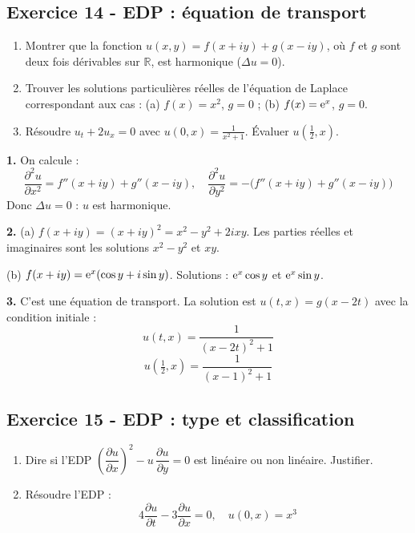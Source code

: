 \documentclass[12pt,a4paper]{article}
\begin{document}
\newpage
\subsection*{Exercice 14 - EDP : équation de transport \niveau{\moyen}}

\begin{boiteexercice}
\begin{enumerate}
  \item Montrer que la fonction $u(x,y) = f(x+iy) + g(x-iy)$, où $f$ et $g$ sont deux fois dérivables sur $\mathbb{R}$, est harmonique ($\Delta u = 0$).
  \item Trouver les solutions particulières réelles de l'équation de Laplace correspondant aux cas : (a) $f(x) = x^2$, $g = 0$ ; (b) $f(x) = \mathrm{e}^x$, $g = 0$.
  \item Résoudre $u_t + 2u_x = 0$ avec $u(0,x) = \frac{1}{x^2+1}$. Évaluer $u\!\left(\frac{1}{2},x\right)$.
\end{enumerate}
\end{boiteexercice}

\begin{boitecorrige}
\textbf{1.} On calcule :
\[
\frac{\partial^2 u}{\partial x^2} = f''(x+iy) + g''(x-iy), \quad \frac{\partial^2 u}{\partial y^2} = -\bigl(f''(x+iy) + g''(x-iy)\bigr)
\]
Donc $\Delta u = 0$ : $u$ est harmonique.

\textbf{2.} (a) $f(x+iy) = (x+iy)^2 = x^2 - y^2 + 2ixy$. Les parties réelles et imaginaires sont les solutions $x^2 - y^2$ et $xy$.

(b) $f(x+iy) = \mathrm{e}^x(\cos y + i\sin y)$. Solutions : $\mathrm{e}^x\cos y$ et $\mathrm{e}^x\sin y$.

\textbf{3.} C'est une équation de transport. La solution est $u(t,x) = g(x-2t)$ avec la condition initiale :
\[
u(t,x) = \frac{1}{(x-2t)^2+1}
\]
\[
u\!\left(\tfrac{1}{2},x\right) = \frac{1}{(x-1)^2+1}
\]
\end{boitecorrige}

\newpage
\subsection*{Exercice 15 - EDP : type et classification \niveau{\moyen}}

\begin{boiteexercice}
\begin{enumerate}
  \item Dire si l'EDP $\left(\dfrac{\partial u}{\partial x}\right)^2 - u\,\dfrac{\partial u}{\partial y} = 0$ est linéaire ou non linéaire. Justifier.
  \item Résoudre l'EDP :
  \[
  4\frac{\partial u}{\partial t} - 3\frac{\partial u}{\partial x} = 0, \quad u(0,x) = x^3
  \]
\end{enumerate}
\end{boiteexercice}
\end{document}
